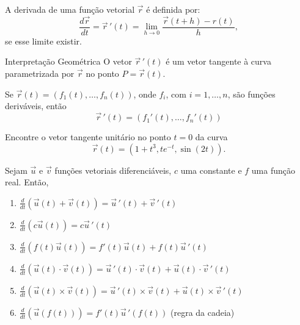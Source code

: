 \newpage



\begin{definb}{}{}
A {\color{blue}derivada} de uma função vetorial $\vec{r}$ é definida por:
\[\frac{d\vec{r}}{dt}=\vec{r}\,'(t)=\lim\limits_{h\to 0}\frac{\vec{r}(t+h)-r(t)}{h},\]
se esse limite existir.
\end{definb}
\vfill

\begin{caixaazul}{Interpretação Geométrica}
O vetor $\vec{r}\,'(t)$ é um {\color{blue}vetor tangente} à curva parametrizada por $\vec{r}$ no ponto $P=\vec{r}(t)$.
\end{caixaazul}

\newpage
\begin{propb}{}{}
Se $\vec{r}(t)=\left(f_1(t),\ldots,f_n(t)\right)$, onde $f_i$, com $i=1,\ldots,n$, são funções deriváveis, então
\[\vec{r}\,'(t)=\left(f_1'(t),\ldots,f_n'(t)\right)\]
\end{propb}

\begin{exeb}{}{}
Encontre o vetor tangente unitário no ponto $t=0$ da curva
\[\vec{r}(t)=\left(1+t^3,te^{-t},\sin(2t)\right).\]
\end{exeb}


\newpage
{}

\begin{propb}{}{}
Sejam $\vec{u}$ e $\vec{v}$ funções vetoriais diferenciáveis, $c$ uma constante e $f$ uma função real. Então,
\begin{enumerate}
\item $\frac{d}{dt}\left(\vec{u}(t)+\vec{v}(t)\right)= \vec{u}\,'(t)+\vec{v}\,'(t)$
\item $\frac{d}{dt}\left(c\vec{u}(t)\right)= c\vec{u}\,'(t)$
\item $\frac{d}{dt}\left(f(t)\vec{u}(t)\right)= f'(t)\vec{u}(t)+f(t)\vec{u}\,'(t)$
\item $\frac{d}{dt}\left(\vec{u}(t)\cdot \vec{v}(t)\right)= \vec{u}\,'(t)\cdot\vec{v}(t)+\vec{u}(t)\cdot\vec{v}\,'(t)$
\item $\frac{d}{dt}\left(\vec{u}(t)\times \vec{v}(t)\right)= \vec{u}\,'(t)\times\vec{v}(t)+\vec{u}(t)\times\vec{v}\,'(t)$
\item $\frac{d}{dt}\left(\vec{u}(f(t))\right)= f'(t)\vec{u}\,'(f(t))$ (regra da cadeia)
\end{enumerate}
\end{propb}

